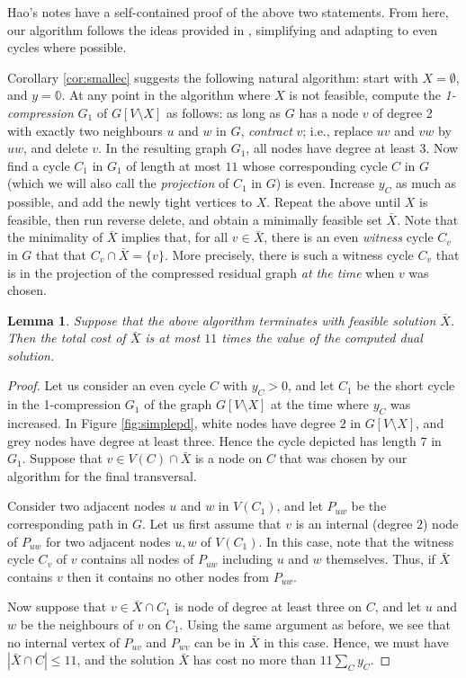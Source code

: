 \documentclass{article}
\newcommand{\0}{\mathbb{0}}
\newcommand{\1}{\mathbb{1}}
\newtheorem{lemma}[theorem]{Lemma}
\begin{document}
Hao's notes have a self-contained proof of the above two statements.
From here, our algorithm follows the ideas provided in \cite{FJP10},
simplifying and adapting to even cycles where possible. 

Corollary \ref{cor:smallec} suggests the following natural algorithm:
start with $X=\emptyset$, and $y=\0$. At any point in the algorithm
where $X$ is not feasible, compute the {\em 1-compression} $G_1$ of
$G[V\setminus X]$ as follows: as long as $G$ has a node $v$ of degree 2 with
exactly two neighbours $u$ and $w$ in $G$, {\em contract} $v$; i.e.,
replace $uv$ and $vw$ by $uw$, and delete $v$. In the resulting graph
$G_1$, all nodes have degree at least $3$. Now find a cycle $C_1$ in
$G_1$ of length at most $11$ whose corresponding cycle $C$ in $G$
(which we will also call the {\em projection} of $C_1$ in $G$)
is
even. Increase $y_C$ as much as possible, and add the newly tight
vertices to $X$. Repeat the above until $X$ is feasible, then run
reverse delete, and obtain a minimally feasible set $\bar{X}$. Note
that the minimality of $\bar{X}$ implies that, for all
$v \in \bar{X}$, there is an even {\em witness} cycle $C_v$ in $G$
that that $C_v \cap \bar{X} = \{v\}$. More precisely,  there is such a
witness cycle $C_v$ that is in the projection of  the compressed
residual graph {\em at the time} when $v$ was chosen. 

\begin{lemma} \label{lem:simplealg}
  Suppose that the above algorithm terminates with
  feasible solution $\bar{X}$. Then the total cost of $\bar{X}$ is at
  most $11$ times the value of the computed dual solution.
\end{lemma}
\begin{proof}
  Let us consider an even cycle $C$ with $y_C>0$, and let $C_1$ be the
  short cycle in the 1-compression $G_1$ of the graph $G[V\setminus
  X]$ at the time where $y_C$ was increased. 
  In Figure
  \ref{fig:simplepd}, white nodes have degree $2$ in $G[V\setminus
  X]$, and grey nodes have degree at least three. Hence the cycle
  depicted has length $7$ in $G_1$. Suppose that $v \in V(C) \cap
  \bar{X}$ is a node on $C$ that was chosen by our algorithm for the
  final transversal.

  Consider two adjacent nodes $u$ and $w$ in $V(C_1)$, and let
  $P_{uw}$ be the corresponding path in $G$. 
  Let us first assume that $v$ is an internal (degree $2$) node of
  $P_{uw}$ for two adjacent nodes $u,w$ of $V(C_1)$. In this case,
  note that the witness cycle $C_v$ of $v$ contains all nodes of
  $P_{uw}$ including $u$ and $w$ themselves. Thus, if $\bar{X}$
  contains $v$ then it contains no other nodes from $P_{uw}$.

  Now suppose that $v \in \bar{X} \cap C_1$ is node of
  degree at least three on $C$, and let $u$ and $w$ be the neighbours
  of $v$ on $C_1$. Using the same argument as before, we see that
  no internal vertex of $P_{uv}$ and $P_{wv}$ can be in $\bar{X}$ in
  this case. Hence, we must have
  $|\bar{X} \cap C| \leq 11$, and the solution
  $\bar{X}$ has cost no more than $11\sum_Cy_C$. 
\end{proof}
\end{document}
